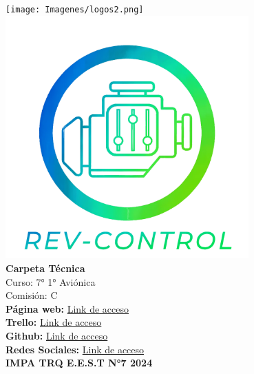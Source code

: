 \documentclass[a4paper,12pt]{report}
\begin{document}

\begin{titlepage}
    \centering
    \texttt{[image: Imagenes/logos2.png]}
    \vspace{1cm}
    \includegraphics[width=0.7\textwidth]{Imagenes/LOGO REV CONTROL OFICIAL2.png}\\
    \vspace{1cm}
    {\Huge \textbf{\textcolor{celeste_rev}{Carpeta Técnica}}\\}
    \vspace{1cm}
    {\Large \textcolor{verde_rev}{Curso: 7° 1° Aviónica}}\\
    \vspace{0.5cm}
    {\Large \textcolor{celeste_rev}{Comisión: C}}\\
    \vspace{1cm}
    \textbf{\textcolor{celeste_rev}{Página web:}} \href{https://www.google.com/}{Link de acceso}\\
    \textbf{\textcolor{celeste_rev}{Trello:}} \href{https://trello.com/b/yDSPDlAp/kanban}{Link de acceso}\\
    \textbf{\textcolor{celeste_rev}{Github:}} \href{https://github.com/impatrq/revcontrol}{Link de acceso}\\
    \textbf{\textcolor{celeste_rev}{Redes Sociales:}} \href{https://www.instagram.com/rev.control/}{Link de acceso}\\
    \vfill
    \textbf{\textcolor{celeste_rev}{IMPA TRQ E.E.S.T N°7 2024}}\\
\end{titlepage}

\tableofcontents
\newpage








\begin{appendix}
   
   
\end{appendix}
\end{document}
